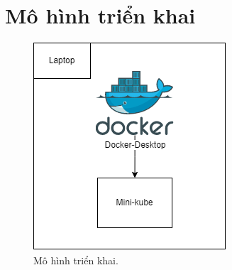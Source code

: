 \documentclass[12pt,a4paper]{report}
\begin{document}
	\section{Mô hình triển khai}
	\begin{figure}[h]
	\centering
	\includegraphics[width=0.7\linewidth]{Pics/diagram}
	\caption{\label{fig:diagram} Mô hình triển khai.}
	\label{fig:diagram}
	\end{figure}
\end{document}
